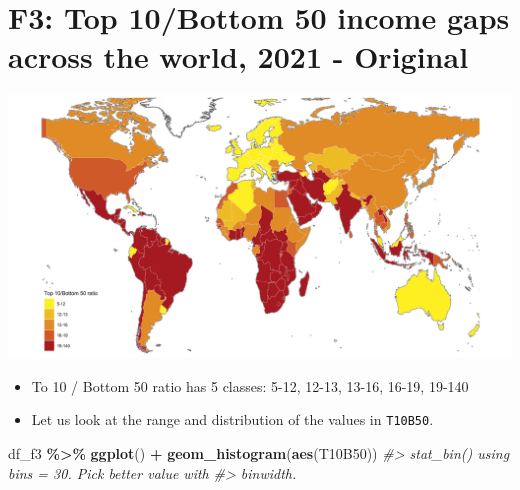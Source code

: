 \documentclass[
  xelatex, ja=standard]{bxjsbook}
\newenvironment{Shaded}{\begin{snugshade}}{\end{snugshade}}
\newcommand{\CommentTok}[1]{\textcolor[rgb]{0.56,0.35,0.01}{\textit{#1}}}
\newcommand{\FunctionTok}[1]{\textcolor[rgb]{0.13,0.29,0.53}{\textbf{#1}}}
\newcommand{\NormalTok}[1]{#1}
\newcommand{\SpecialCharTok}[1]{\textcolor[rgb]{0.81,0.36,0.00}{\textbf{#1}}}
\theoremstyle{definition}
\theoremstyle{definition}
\theoremstyle{definition}
\theoremstyle{definition}
\theoremstyle{remark}
\begin{document}
\hypertarget{f3-top-10bottom-50-income-gaps-across-the-world-2021---original}{%
\section{F3: Top 10/Bottom 50 income gaps across the world, 2021 - Original}\label{f3-top-10bottom-50-income-gaps-across-the-world-2021---original}}

\includegraphics[width=1\linewidth]{./data/F3}

\begin{itemize}
\item
  To 10 / Bottom 50 ratio has 5 classes: 5-12, 12-13, 13-16, 16-19, 19-140
\item
  Let us look at the range and distribution of the values in \texttt{T10B50}.
\end{itemize}

\begin{Shaded}
\end{Shaded}

\begin{Shaded}
\begin{Highlighting}[]
\NormalTok{df\_f3 }\SpecialCharTok{\%\textgreater{}\%} \FunctionTok{ggplot}\NormalTok{() }\SpecialCharTok{+} \FunctionTok{geom\_histogram}\NormalTok{(}\FunctionTok{aes}\NormalTok{(T10B50))}
\CommentTok{\#\textgreater{} \textasciigrave{}stat\_bin()\textasciigrave{} using \textasciigrave{}bins = 30\textasciigrave{}. Pick better value with}
\CommentTok{\#\textgreater{} \textasciigrave{}binwidth\textasciigrave{}.}
\end{Highlighting}
\end{Shaded}
\end{document}
